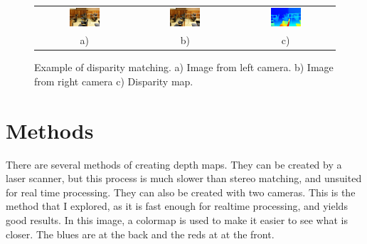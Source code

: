 \documentclass[11pt,fleqn]{article}
\begin{document}
\begin{figure}[!ht]
\centering
\setlength{}
\begin{tabular}{ccc}
\includegraphics[width=0.33\textwidth]{images/im0-600.jpg} &
\includegraphics[width=0.33\textwidth]{images/im1-600.jpg} &
\includegraphics[width=0.33\textwidth]{images/disp-600.jpg} \\[2pt]
a) & b) & c) \\
\end{tabular}
\caption{Example of disparity matching. a) Image from left camera. b) Image from right camera c) Disparity map.}
\label{fig:example1}
\end{figure}




\section{Methods}
There are several methods of creating depth maps.
They can be created by a laser scanner, but this process is much slower than stereo matching, and unsuited for real time processing. They can also be created with two cameras. This is the method that I explored, as it is fast enough for realtime processing, and yields good results. In this image, a colormap is used to make it easier to see what is closer. The blues are at the back and the reds at at the front.
\end{document}
